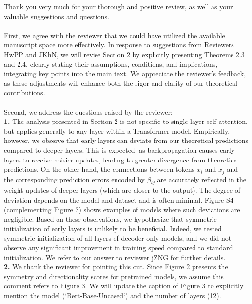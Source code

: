 \documentclass[11pt]{article}
\begin{document}
Thank you very much for your thorough and positive review, as well as your valuable suggestions and questions. 
%
\\\\
%
First, we agree with the reviewer that we could have utilized the available manuscript space more effectively. In response to suggestions from Reviewers HwPP and JKhN, we will revise Section 2 by explicitly presenting Theorems 2.3 and 2.4, clearly stating their assumptions, conditions, and implications, integrating key points into the main text. We appreciate the reviewer’s feedback, as these adjustments will enhance both the rigor and clarity of our theoretical contributions.
%
\\\\
%
Second, we address the questions raised by the reviewer:
%
\\
%
\textbf{1.} 
%
The analysis presented in Section 2 is not specific to single-layer self-attention, but applies generally to any layer within a Transformer model. Empirically, however, we observe that early layers can deviate from our theoretical predictions compared to deeper layers. This is expected, as backpropagation causes early layers to receive noisier updates, leading to greater divergence from theoretical predictions. On the other hand, the connections between tokens $x_i$ and $x_j$ and the corresponding prediction errors encoded by $\beta_{ij}$ are accurately reflected in the weight updates of deeper layers (which are closer to the output). The degree of deviation depends on the model and dataset and is often minimal. Figure S4 (complementing Figure 3) shows examples of models where such deviations are negligible. Based on these observations, we hypothesize that symmetric initialization of early layers is unlikely to be beneficial. Indeed, we tested symmetric initialization of all layers of decoder-only models, and we did not observe any significant improvement in training speed compared to standard initialization. We refer to our answer to reviewer jZNG for further details. 
%
\\
%
\textbf{2.} We thank the reviewer for pointing this out. Since Figure 2 presents the symmetry and directionality scores for pretrained models, we assume this comment refers to Figure 3. We will update the caption of Figure 3 to explicitly mention the model (`Bert-Base-Uncased`) and the number of layers (12).
\end{document}
